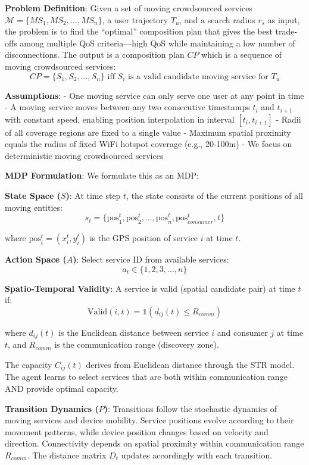 \textbf{Problem Definition}: Given a set of moving crowdsourced services
\(\mathcal{M} = \{MS_1, MS_2, ..., MS_n\}\), a user trajectory \(T_u\),
and a search radius \(r_s\) as input, the problem is to find the
``optimal'' composition plan that gives the best trade-offs among
multiple QoS criteria---high QoS while maintaining a low number of
disconnections. The output is a composition plan \(CP\) which is a
sequence of moving crowdsourced services:
\[CP = \{S_1, S_2, ..., S_n\} \text{ iff } S_i \text{ is a valid candidate moving service for } T_u\]

\textbf{Assumptions}: - One moving service can only serve one user at
any point in time - A moving service moves between any two consecutive
timestamps \(t_i\) and \(t_{i+1}\) with constant speed, enabling
position interpolation in interval \([t_i, t_{i+1}]\) - Radii of all
coverage regions are fixed to a single value - Maximum spatial proximity
equals the radius of fixed WiFi hotspot coverage (e.g., 20-100m) - We
focus on deterministic moving crowdsourced services

\textbf{MDP Formulation}: We formulate this as an MDP:

\textbf{State Space (\(S\))}: At time step \(t\), the state consists of
the current positions of all moving entities:
\[s_t = \{\text{pos}_1^t, \text{pos}_2^t, ..., \text{pos}_n^t, \text{pos}_{consumer}^t, t\}\]

where \(\text{pos}_i^t = (x_i^t, y_i^t)\) is the GPS position of service
\(i\) at time \(t\).

\textbf{Action Space (\(A\))}: Select service ID from available
services: \[a_t \in \{1, 2, 3, ..., n\}\]

\textbf{Spatio-Temporal Validity}: A service is valid (spatial candidate
pair) at time \(t\) if:
\[\text{Valid}(i, t) = \mathbb{1}(d_{ij}(t) \leq R_{comm})\]

where \(d_{ij}(t)\) is the Euclidean distance between service \(i\) and
consumer \(j\) at time \(t\), and \(R_{comm}\) is the communication
range (discovery zone).

The capacity \(C_{ij}(t)\) derives from Euclidean distance through the
STR model. The agent learns to select services that are both within
communication range AND provide optimal capacity.

\textbf{Transition Dynamics (\(P\))}: Transitions follow the stochastic
dynamics of moving services and device mobility. Service positions
evolve according to their movement patterns, while device position
changes based on velocity and direction. Connectivity depends on spatial
proximity within communication range \(R_{comm}\). The distance matrix
\(D_t\) updates accordingly with each transition.

